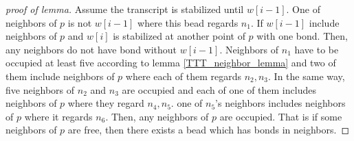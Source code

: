 \documentclass[runningheads]{llncs}
\begin{document}
\begin{proof}[proof of lemma]
Assume the transcript is stabilized until $w[i-1]$. One of neighbors of $p$ is not $w[i-1]$ where this bead regards $n_1$. If $w[i-1]$ include neighbors of $p$ and $w[i]$ is stabilized at another point of $p$ with one bond. Then, any neighbors do not have bond without $w[i-1]$. Neighbors of $n_1$ have to be occupied at least five according to lemma \ref{TTT_neighbor_lemma} and two of them include neighbors of $p$ where each of them regards $n_2, n_3$. In the same way, five neighbors of $n_2$ and $n_3$ are occupied and each of one of them includes neighbors of $p$ where they regard $n_4, n_5$. one of $n_5$'s neighbors includes neighbors of $p$ where it regards $n_6$. Then, any neighbors of $p$ are occupied. That is if some neighbors of $p$ are free, then there exists a bead which has bonds in neighbors.
\end{proof}
\end{document}

